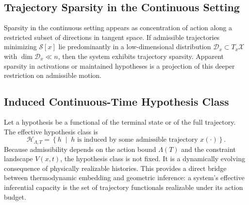 \documentclass[12pt]{article}
\theoremstyle{plain}
\theoremstyle{definition}
\theoremstyle{remark}
\begin{document}
\subsection{Trajectory Sparsity in the Continuous Setting}

Sparsity in the continuous setting appears as concentration of action along a restricted subset of directions in tangent space. If admissible trajectories minimizing $\mathcal{S}[x]$ lie predominantly in a low-dimensional distribution $\mathcal{D}_x \subset T_x\mathcal{X}$ with $\dim \mathcal{D}_x \ll n$, then the system exhibits trajectory sparsity. Apparent sparsity in activations or maintained hypotheses is a projection of this deeper restriction on admissible motion.

\subsection{Induced Continuous-Time Hypothesis Class}

Let a hypothesis be a functional of the terminal state or of the full trajectory. The effective hypothesis class is
\[
\mathcal{H}_{\Lambda,T} = \left\{ h \;\middle|\; h \text{ is induced by some admissible trajectory } x(\cdot) \right\}.
\]
Because admissibility depends on the action bound $\Lambda(T)$ and the constraint landscape $V(x,t)$, the hypothesis class is not fixed. It is a dynamically evolving consequence of physically realizable histories. This provides a direct bridge between thermodynamic embedding and geometric inference: a system's effective inferential capacity is the set of trajectory functionals realizable under its action budget.
\end{document}
